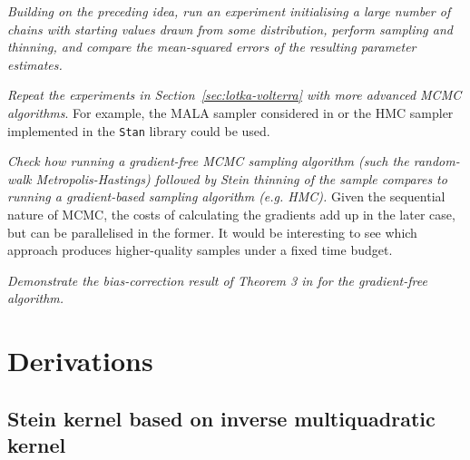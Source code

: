 \documentclass[11pt,a4paper]{report}
\begin{document}
\textit{Building on the preceding idea, run an experiment initialising a large number of chains with starting values drawn from some distribution, perform sampling and thinning, and compare the mean-squared errors of the resulting parameter estimates.}

\textit{Repeat the experiments in Section~\ref{sec:lotka-volterra} with more advanced MCMC algorithms}. For example, the MALA sampler considered in \cite{riabizOptimalThinningMCMC2022} or the HMC sampler implemented in the \texttt{Stan} library could be used.

\textit{Check how running a gradient-free MCMC sampling algorithm (such the random-walk Metropolis-Hastings) followed by Stein thinning of the sample compares to running a gradient-based sampling algorithm (e.g. HMC).} Given the sequential nature of MCMC, the costs of calculating the gradients add up in the later case, but can be parallelised in the former. It would be interesting to see which approach produces higher-quality samples under a fixed time budget.

\textit{Demonstrate the bias-correction result of Theorem 3 in \cite{riabizOptimalThinningMCMC2022} for the gradient-free algorithm.}





\appendix
\chapter{Derivations}
\label{appendix:derivations}

\section{Stein kernel based on inverse multiquadratic kernel}
\label{appendix:derivations:imq-stein}
\end{document}
